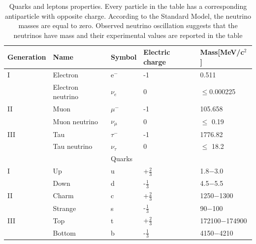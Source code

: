 \begin{table}[bht]
\caption[]{Quarks and leptons properties. Every particle in the table has a corresponding
antiparticle with opposite charge. According to the Standard Model, the neutrino masses are
equal to zero. Observed neutrino oscillation suggests that the neutrinos have mass and their
experimental values are reported in the table}
\label{tab:StandardModelQuarksAndLeptons}
\begin{tabular}{lllll} 
Generation  &Name                                   &Symbol     &Electric charge        &Mass[MeV/c$^{2}$] \\
\hline
I           &Electron                              &e$^{-}$      &-1                     &0.511 \\
            &Electron neutrino                     &$\nu_{e}$    &0                      &$\leq$0.000225 \\ 

\hline
II         &Muon                                  &$\mu^{-}$      &-1                     &105.658 \\
            &Muon neutrino                         &$\nu_{\mu}$    &0                      &$\leq$ 0.19 \\ 

\hline
III         &Tau                                   &$\tau^{-}$     &-1                     &1776.82 \\
            &Tau neutrino                          &$\nu_{\tau}$    &0                      &$\leq$ 18.2 \\ 

\hline
             &                                    &Quarks         &                       &              \\

\hline
I            &Up                                   &u            &+$\frac{2}{3}$         &1.8$-$3.0 \\
             &Down                                 &d            &-$\frac{1}{3}$         &4.5$-$5.5 \\
\hline
II           &Charm                                &c            &+$\frac{2}{3}$         &1250$-$1300 \\
             &Strange                              &s            &-$\frac{1}{3}$         &90$-$100    \\

\hline
III          &Top                                &t            &+$\frac{2}{3}$         &172100$-$174900 \\
             &Bottom                             &b            &-$\frac{1}{3}$         &4150$-$4210    \\
\end{tabular}
\end{table} 



